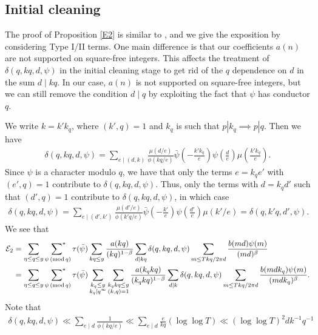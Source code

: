 \documentclass[oneside, 12pt]{amsart}
\theoremstyle{definition}
\renewcommand{\pmod}[1]{\,(\textup{mod}\,#1)}
\begin{document}
\subsection{Initial cleaning}
The proof of Proposition \ref{E2} is similar to \cite{HBB}, and we give the exposition by considering Type I/II terms. One main difference is that our coefficients $a(n)$ are not supported on square-free integers. This affects the treatment of $\delta(q, kq, d, \psi)$ in the initial cleaning stage to get rid of the $q$ dependence on $d$ in the sum $d\mid kq$. In our case, $a(n)$ is not supported on square-free integers, but we can still remove the condition $d\mid q$ by exploiting the fact that $\psi $ has conductor $q$. 

	We write $k=k' k_q$, where $(k',q)=1$ and $k_q$ is such that $p|k_q\implies p|q$. Then we have 
	\begin{align*}
	\delta(q, kq, d, \psi)=\sum_{e\mid (d, k)}\frac{\mu(d/e)}{\phi(kq/e)}\bar{\psi}\left( -\frac{k'k_q}{e}\right)\psi\left( \frac{d}{e}\right)\mu\left( \frac{k'k_q}{e}\right).
	\end{align*}
	Since $\psi$ is a character modulo $q$, we have that only the terms $e=k_qe'$ with $(e',q)=1$ contribute to $\delta(q, kq, d, \psi)$. Thus, only the terms with $d=k_qd'$ such that $(d',q)=1$ contribute to $\delta(q, kq, d, \psi)$, in which case
	\begin{align*}
	\delta(q, kq,d, \psi)= \sum_{e\mid (d',k')} \frac{\mu(d'/e)}{\phi(k'q/e)}\bar{\psi}\left(- \frac{k'}{e}\right)\psi\left(\frac{d'}{e}\right)\mu(k'/e)=\delta(q, k'q, d',\psi).
	\end{align*}
	We see that
\begin{align*}
\mathcal{E}_2&=\sum_{\eta \leq q\leq y} \sideset{}{^*}\sum_{\,\,\psi \pmod q} \tau(\bar{\psi}) \sum_{kq\leq y} \frac{a(kq)}{(kq)^{1-\beta}}\sum_{d\mid kq} \delta(q, kq, d, \psi)\sum_{m\leq Tkq/2\pi d}\frac{b(md)\psi(m)}{(md)^\beta}\\
&=\sum_{\eta \leq q\leq y} \sideset{}{^*}\sum_{\,\,\psi \pmod q} \tau(\bar{\psi}) \sum_{\substack{k_q\leq y\\ k_q\mid q^\infty}}\sum_{\substack{k_qkq\leq y\\ (k, q)=1}} \frac{a(k_qkq)}{(k_qkq)^{1-\beta}}\sum_{\substack{d\mid k}} \delta(q, kq, d, \psi)
\sum_{m\leq Tkq/2\pi d}\frac{b(mdk_q)\psi(m)}{(mdk_q)^\beta}.
\end{align*}
Note that 
\begin{align}
	\delta(q, kq, d, \psi) \ll \sum_{e\mid d} \frac{1}{\phi(kq/e)} \ll \sum_{e\mid d}\frac{e}{kq}(\log \log T)\ll  (\log\log T)^2 dk^{-1}q^{-1}
\end{align}
\end{document}
